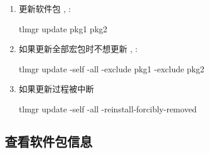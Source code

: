 \begin{frame}[fragile,t]
  \begin{enumerate}[<3->]
    \item 更新软件包 , :
\begin{cmdcode}
tlmgr update pkg1 pkg2
\end{cmdcode}
    \item 如果更新全部宏包时不想更新 , :
\begin{cmdcode}
tlmgr update -self -all -exclude pkg1 -exclude pkg2
\end{cmdcode}
    \item 如果更新过程被中断
\begin{cmdcode}
tlmgr update -self -all -reinstall-forcibly-removed
\end{cmdcode}
  \end{enumerate}
\end{frame}

\subsection{查看软件包信息}

